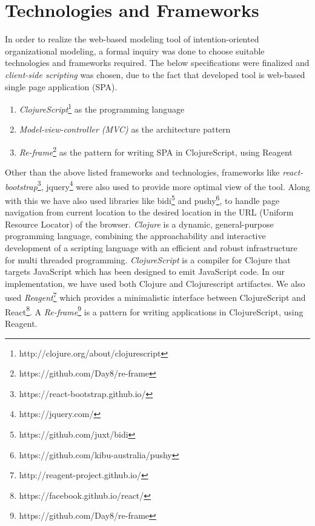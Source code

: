 \section{Technologies and Frameworks}
\label{subsec:specifications}
In order to realize the web-based modeling tool of intention-oriented organizational modeling, a formal inquiry was done to choose suitable technologies and frameworks required. The below specifications were finalized and \textit{client-side scripting} \cite{Sierra2012} was chosen, due to the fact that developed tool is web-based single page application (SPA). 

\begin{enumerate}   
	\item \textit{ClojureScript}\footnote{http://clojure.org/about/clojurescript} as the programming language
	\item \textit{Model-view-controller (MVC)} \cite{Deacon2009}  as the architecture pattern
	\item \textit{Re-frame}\footnote{https://github.com/Day8/re-frame} as the pattern for writing SPA \cite{Mikowski2013} in ClojureScript, using Reagent	
\end{enumerate}

Other than the above listed frameworks and technologies, frameworks like \textit{react-bootstrap}\footnote{https://react-bootstrap.github.io/}, jquery\footnote{https://jquery.com/} were also used to provide more optimal view of the tool. Along with this we have also used libraries like bidi\footnote{https://github.com/juxt/bidi} and pushy\footnote{https://github.com/kibu-australia/pushy}, to handle page navigation from current location to the desired location in the URL (Uniform Resource Locator) of the browser. \textit{Clojure} is a dynamic, general-purpose programming language, combining the approachability and interactive development of a scripting language with an efficient and robust infrastructure for multi threaded programming. \textit{ClojureScript} is a compiler for Clojure that targets JavaScript which has been designed to emit JavaScript code. In our implementation, we have used both Clojure and Clojurescript artifactes. We also used \textit{Reagent}\footnote{http://reagent-project.github.io/} which provides a minimalistic interface between ClojureScript and React\footnote{https://facebook.github.io/react/}. A \textit{Re-frame}\footnote{https://github.com/Day8/re-frame} is a pattern for writing applications in ClojureScript, using Reagent.

